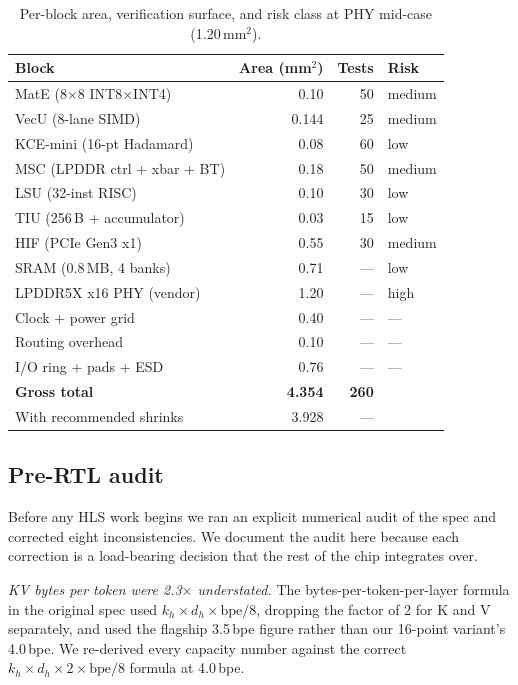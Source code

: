\documentclass[conference]{IEEEtran}
\begin{document}
\begin{table}[t]
\centering
\caption{Per-block area, verification surface, and risk class at PHY mid-case (1.20\,mm$^2$).}
\label{tab:area}
\setlength{\tabcolsep}{4pt}
\renewcommand{\arraystretch}{1.05}
\footnotesize
\begin{tabular}{lrrl}
\toprule
\textbf{Block} & \textbf{Area (mm$^2$)} & \textbf{Tests} & \textbf{Risk} \\
\midrule
MatE (8$\times$8 INT8$\times$INT4) & 0.10 & 50 & medium \\
VecU (8-lane SIMD)         & 0.144 & 25 & medium \\
KCE-mini (16-pt Hadamard)  & 0.08 & 60 & low \\
MSC (LPDDR ctrl + xbar + BT) & 0.18 & 50 & medium \\
LSU (32-inst RISC)         & 0.10 & 30 & low \\
TIU (256\,B + accumulator) & 0.03 & 15 & low \\
HIF (PCIe Gen3 x1)         & 0.55 & 30 & medium \\
\midrule
SRAM (0.8\,MB, 4 banks)    & 0.71 & --- & low \\
LPDDR5X x16 PHY (vendor)   & 1.20 & --- & high \\
\midrule
Clock + power grid         & 0.40 & --- & --- \\
Routing overhead           & 0.10 & --- & --- \\
I/O ring + pads + ESD      & 0.76 & --- & --- \\
\midrule
\textbf{Gross total}       & \textbf{4.354} & \textbf{260} & \\
With recommended shrinks   & 3.928 & --- & \\
\bottomrule
\end{tabular}
\end{table}

\subsection{Pre-RTL audit}

Before any HLS work begins we ran an explicit numerical audit of the spec and corrected eight inconsistencies. We document the audit here because each correction is a load-bearing decision that the rest of the chip integrates over.

\textit{KV bytes per token were 2.3$\times$ understated.} The bytes-per-token-per-layer formula in the original spec used $k_h \times d_h \times \mathrm{bpe}/8$, dropping the factor of 2 for K and V separately, and used the flagship 3.5\,bpe figure rather than our 16-point variant's 4.0\,bpe. We re-derived every capacity number against the correct $k_h \times d_h \times 2 \times \mathrm{bpe}/8$ formula at 4.0\,bpe.
\end{document}
